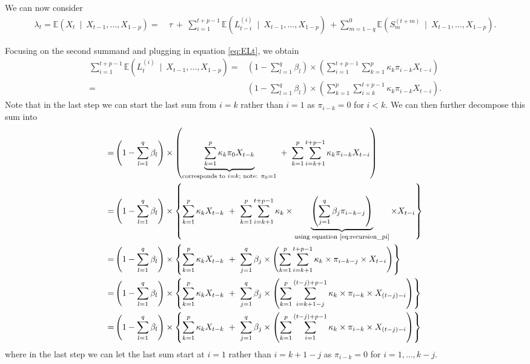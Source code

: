 \documentclass[review]{elsarticle}
\begin{document}
We can now consider
\begin{align}
\lambda_t = \mathbb{E}(X_t \ \mid \ X_{t - 1}, \dots, X_{1 - p}) = & \ \tau 
\ + \ \sum_{i = 1}^{t + p - 1}\mathbb{E}(L^{(i)}_{t - i} \ \mid \ X_{t - 1}, \dots, X_{1 - p})
\ + \sum_{m = 1 - q}^0 \mathbb{E}(S_{m}^{(t + m)}  \ \mid \ X_{t - 1}, \dots, X_{1 - p}).\label{eq:lambda_t_pq_recursion1}
\end{align}

Focusing on the second summand and plugging in equation \eqref{eq:ELt}, we obtain
\begin{align*}
\sum_{i = 1}^{t + p - 1}\mathbb{E}(L^{(i)}_t \ \mid \ X_{t - 1}, \dots, X_{1 - p}) = & \left(1 - \sum_{l = 1}^q \beta_l\right) \times \left( \sum_{i = 1}^{t + p - 1} \sum_{k = 1}^p \kappa_k \pi_{i - k} X_{t - i}\right)\\
= & \left(1 - \sum_{l = 1}^q \beta_l\right) \times \left(\sum_{k = 1}^p \sum_{i = k}^{t + p - 1} \kappa_k \pi_{i - k} X_{t - i}\right).
\end{align*}
Note that in the last step we can start the last sum from $i = k$ rather than $i = 1$ as $\pi_{i - k} = 0$ for $i < k$. We can then further decompose this sum into
\begin{align}
= & \left(1 - \sum_{l = 1}^q \beta_l\right) \times \left(\underbrace{\sum_{k = 1}^p \kappa_k \pi_0 X_{t - k}}_{\text{corresponds to } i = k; \text{ note: } \pi_0 = 1} \ + \ \sum_{k = 1}^p \sum_{i = k + 1}^{t + p - 1} \kappa_k \pi_{i - k} X_{t - i}\right)\nonumber\\
= & \left(1 - \sum_{l = 1}^q \beta_l\right) \times \left\{\sum_{k = 1}^p \kappa_k X_{t - k} \ + \ \sum_{k = 1}^p \sum_{i = k + 1}^{t + p - 1} \kappa_k \times \underbrace{\left(\sum_{j = 1}^q \beta_j \pi_{i - k - j}\right)}_{\text{using equation \eqref{eq:recursion_pi}}} \times X_{t - i}\right\}\nonumber\\
= & \left(1 - \sum_{l = 1}^q \beta_l\right) \times \left\{\sum_{k = 1}^p \kappa_k X_{t - k} \ + \ \sum_{j = 1}^q \beta_j \times \left(\sum_{k = 1}^p \sum_{i = k + 1}^{t + p - 1} \kappa_k \times \pi_{i - k - j} \times X_{t - i}\right)\right\}\nonumber\\
= & \left(1 - \sum_{l = 1}^q \beta_l\right) \times \left\{\sum_{k = 1}^p \kappa_k X_{t - k} \ + \ \sum_{j = 1}^q \beta_j \times \left(\sum_{k = 1}^p \sum_{i = k + 1 - j}^{(t - j) + p - 1} \kappa_k \times \pi_{i - k} \times X_{(t - j) - i}\right)\right\}\nonumber\\
= & \left(1 - \sum_{l = 1}^q \beta_l\right) \times \left\{\sum_{k = 1}^p \kappa_k X_{t - k} \ + \ \sum_{j = 1}^q \beta_j \times \left(\sum_{k = 1}^p \sum_{i = 1}^{(t - j) + p - 1} \kappa_k \times \pi_{i - k} \times X_{(t - j) - i}\right)\right\}\label{eq:substitution_ELt}
\end{align}
where in the last step we can let the last sum start at $i = 1$ rather than $i = k + 1 - j$ as $\pi_{i - k} = 0$ for $i = 1, \dots, k - j$.
\end{document}
